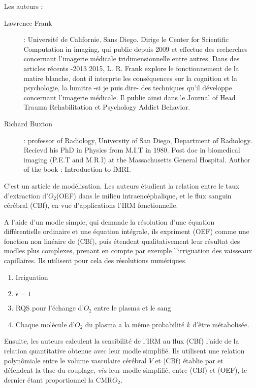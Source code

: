 Les auteurs :
\begin{description}
\item[Lawrence Frank] : Universit\'e de Californie, Sans Diego. Dirige le Center for Scientific Computation in imaging, qui publie depuis 2009 %
et effectue des recherches concernant l'imagerie m\'edicale tridimensionnelle entre autres. %
Dans des articles r\'ecents -2013  2015, L. R. Frank explore le fonctionnement de la matire blanche, dont il interprte les cons\'equences sur la cognition et la psychologie, %
 la lumitre -si je puis dire- des techniques qu'il d\'eveloppe concernant l'imagerie m\'edicale. %
Il publie ainsi dans le Journal of Head Trauma Rehabilitation et Psychology Addict Behavior.
\item[Richard Buxton] : professor of Radiology, University of San Diego, Department of Radiology. Recievd his PhD in Physics from M.I.T in 1980. %
Post doc in biomedical imaging (P.E.T and M.R.I) at the Massachusetts General Hospital. Author of the book : Introduction to fMRI.
\end{description}

\ligneinter

C'est un article de mod\'elisation. Les auteurs \'etudient la relation entre le taux d'extraction d'$O_2$(OEF) dans le milieu intraenc\'ephalique, %
et le flux sanguin c\'er\'ebral (CBf), en vue d'applications  l'IRM fonctionnelle.

\par
A l'aide d'un modle simple, qui demande la r\'esolution d'une \'equation diff\'erentielle ordinaire et une \'equation int\'egrale, %
ils expriment (OEF) comme une fonction non lin\'eaire de (CBf), %
puis \'etendent qualitativement leur r\'esultat  des modles plus complexes, %
prenant en compte par exemple l'irriguation des vaisseaux capillaires. %
Ils utilisent pour cela des r\'esolutions num\'eriques.
\begin{enumerate}[label=(H\arabic*)]
\item Irriguation
\item $\epsilon=1$
\item RQS pour l'\'echange d'$O_2$ entre le plasma et le sang
\item Chaque mol\'ecule d'$O_2$ du plasma a la m\^eme probabilit\'e $k$ d'\^etre m\'etabolis\'ee.
\end{enumerate}

\par
Ensuite, les auteurs calculent la sensibilit\'e de l'IRM au flux (CBf)  l'aide de la relation quantitative obtenue avec leur modle simplifi\'e. %
Ils utilisent une relation polyn\^omiale entre le volume vasculaire c\'er\'ebral $V$ et (CBf) \'etablie par %
et d\'efendent la thse du couplage, \textit{via} leur modle simplifi\'e, entre (CBf) et (OEF), le dernier \'etant proportionnel  la CMR$O_2$.

